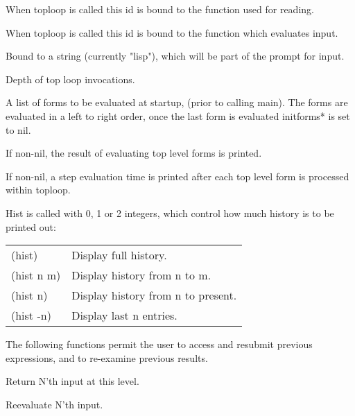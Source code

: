 {
    When toploop is called this id is bound to the function used
    for reading.
}

{
    When toploop is called this id  is  bound  to  the  function
    which evaluates input.
}

{
    Bound to a string (currently "lisp"), which will be part  of
    the prompt for input.
}

{
    Depth of top loop invocations.
}

{
    A  list  of  forms  to  be  evaluated  at startup, (prior to
    calling main).  The forms are evaluated in a left  to  right
    order,  once the last form is evaluated initforms* is set to
    nil.
}

{
    If non-nil, the result of  evaluating  top  level  forms  is
    printed.
}

{
    If non-nil, a step evaluation time is printed after each top
    level form is processed within toploop.
}

{    Hist  is  called  with 0, 1 or 2 integers, which control how
    much history is to be printed out:

\begin{center}
\begin{tabular}{ll}
    (hist) & Display full history.\\

    (hist n m) & Display history from n to m.\\

    (hist n) & Display history from n to present.\\

    (hist -n) & Display last n entries.\\
\end{tabular}
\end{center}
}

  The following functions permit the user to access and resubmit
previous expressions, and to re-examine previous results.


{    Return N'th input at this level.
}

{    Reevaluate N'th input.
}

